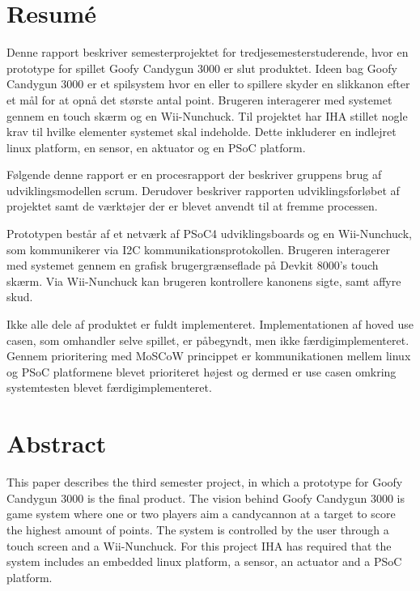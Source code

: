 \chapter{Resumé}
Denne rapport beskriver semesterprojektet for tredjesemesterstuderende, hvor en prototype for spillet Goofy Candygun 3000 er slut produktet. Ideen bag Goofy Candygun 3000 er et spilsystem hvor en eller to spillere skyder en slikkanon efter et mål for at opnå det største antal point. Brugeren interagerer med systemet gennem en touch skærm og en Wii-Nunchuck. Til projektet har IHA stillet nogle krav til hvilke elementer systemet skal indeholde. Dette inkluderer en indlejret linux platform, en sensor, en aktuator og en PSoC platform. \newline

\noindent Følgende denne rapport er en procesrapport der beskriver gruppens brug af udviklingsmodellen scrum. Derudover beskriver rapporten udviklingsforløbet af projektet samt de værktøjer der er blevet anvendt til at fremme processen. \newline

\noindent Prototypen består af et netværk af PSoC4 udviklingsboards og en Wii-Nunchuck, som kommunikerer via I2C kommunikationsprotokollen. Brugeren interagerer med systemet gennem en grafisk brugergrænseflade på Devkit 8000's touch skærm. Via Wii-Nunchuck kan brugeren kontrollere kanonens sigte, samt affyre skud. \newline

\noindent Ikke alle dele af produktet er fuldt implementeret. Implementationen af hoved use casen, som omhandler selve spillet, er påbegyndt, men ikke færdigimplementeret. Gennem prioritering med MoSCoW princippet er kommunikationen mellem linux og PSoC platformene blevet prioriteret højest og dermed er use casen omkring systemtesten blevet færdigimplementeret.

\chapter{Abstract}
This paper describes the third semester project, in which a prototype for Goofy Candygun 3000 is the final product. The vision behind Goofy Candygun 3000 is game system where one or two players aim a candycannon at a target to score the highest amount of points. The system is controlled by the user through a touch screen and a Wii-Nunchuck. For this project IHA has required that the system includes an embedded linux platform, a sensor, an actuator and a PSoC platform. \newline

